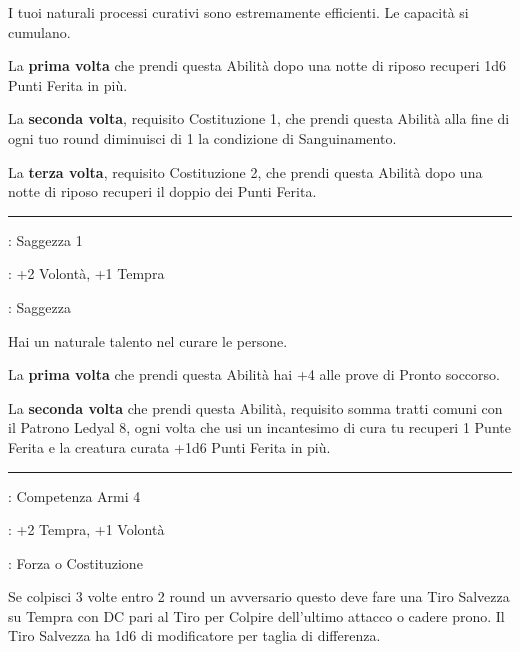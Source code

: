 \begin{multicols}{2}
I tuoi naturali processi curativi sono estremamente efficienti. Le capacità si cumulano.

La \textbf{prima volta} che prendi questa Abilità dopo una notte di riposo recuperi 1d6 Punti Ferita in più.

La \textbf{seconda volta}, requisito Costituzione 1,  che prendi questa Abilità alla fine di ogni tuo round diminuisci di 1 la condizione di Sanguinamento.

La \textbf{terza volta}, requisito Costituzione 2, che prendi questa Abilità dopo una notte di riposo recuperi il doppio dei Punti Ferita.

\smallskip\noindent\rule{\linewidth}{2pt} \hypertarget{Guaritore}{}\medskip{}
\noindent
\begin{description}[noitemsep, topsep=0pt, parsep=0pt, partopsep=0pt, leftmargin=0cm, labelwidth=2.5cm]
    \item[\textbf{Requisito}]: Saggezza 1
    \item[\textbf{Tiri Salvezza}]: +2 Volontà, +1 Tempra
    \item[\textbf{Caratteristica}]: Saggezza
\end{description}

Hai un naturale talento nel curare le persone.

La \textbf{prima volta} che prendi questa Abilità hai +4 alle prove di Pronto soccorso.

La \textbf{seconda volta} che prendi questa Abilità, requisito somma tratti comuni con il Patrono Ledyal 8, ogni volta che usi un incantesimo di cura tu recuperi 1 Punte Ferita e la creatura curata +1d6 Punti Ferita in più.

\smallskip\noindent\rule{\linewidth}{2pt} \hypertarget{Ho detto CADI!}{}\medskip{}
\noindent
\begin{description}[noitemsep, topsep=0pt, parsep=0pt, partopsep=0pt, leftmargin=0cm, labelwidth=2.5cm]
    \item[\textbf{Requisito}]: Competenza Armi 4
    \item[\textbf{Tiri Salvezza}]: +2 Tempra, +1 Volontà
    \item[\textbf{Caratteristica}]: Forza o Costituzione
\end{description}

Se colpisci 3 volte entro 2 round un avversario questo deve fare una Tiro Salvezza su Tempra con DC pari al Tiro per Colpire dell'ultimo attacco o cadere prono. Il Tiro Salvezza ha 1d6 di modificatore per taglia di differenza.


\end{multicols}

